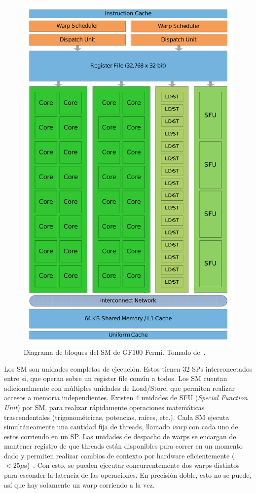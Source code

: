 \begin{figure}[htbp]
    \centering
    \includegraphics[width=\plotwidth]{images/fermi-sm.pdf}
    \caption{Diagrama de bloques del SM de GF100 Fermi. Tomado de~\cite{NvidiaFermi}.}
    \label{fermi_sm}
\end{figure}

Los SM son unidades completas de ejecuci\'on. Estos tienen 32 SPs interconectados entre si, que operan sobre
un register file com\'un a todos. Los SM cuentan adicionalmente con m\'ultiples unidades de Load/Store,
que permiten realizar accesos a memoria independientes. Existen 4 unidades de SFU (\textit{Special Function
Unit}) por SM, para realizar r\'apidamente operaciones matem\'aticas trascendentales (trigonom\'etricas, potencias,
ra\'ices, etc.). Cada SM ejecuta simult\'aneamente una cantidad fija de threads, llamado \textit{warp}
con cada uno de estos corriendo en un SP. Las unidades de despacho de warps se encargan de mantener registro de que
threads est\'an disponibles para correr en un momento dado y permiten realizar cambios de contexto por hardware
eficientemente ($<25 \mu$s)~\cite{PattersonFermi}. Con esto, se pueden ejecutar
concurrentemente dos warps distintos para esconder la latencia de las operaciones. En precisi\'on doble,
esto no se puede, as\'i que hay solamente un warp corriendo a la vez.

